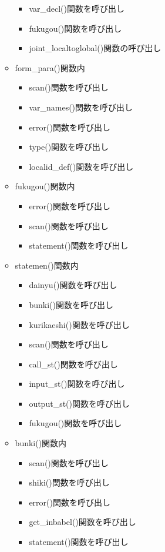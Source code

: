 \documentclass{jarticle}
\begin{document}
\begin{itemize}
\begin{itemize}
\begin{itemize}
      \item var\_decl()関数を呼び出し
      \item fukugou()関数を呼び出し
      \item joint\_localtoglobal()関数の呼び出し
    \end{itemize}
    \item form\_para()関数内
    \begin{itemize}
      \item scan()関数を呼び出し
      \item var\_names()関数を呼び出し
      \item error()関数を呼び出し
      \item type()関数を呼び出し
      \item localid\_def()関数を呼び出し
    \end{itemize}
    \item fukugou()関数内
    \begin{itemize}
      \item error()関数を呼び出し
      \item scan()関数を呼び出し
      \item statement()関数を呼び出し
    \end{itemize}
    \item statemen()関数内
    \begin{itemize}
      \item dainyu()関数を呼び出し
      \item bunki()関数を呼び出し
      \item kurikaeshi()関数を呼び出し
      \item scan()関数を呼び出し
      \item call\_st()関数を呼び出し
      \item input\_st()関数を呼び出し
      \item output\_st()関数を呼び出し
      \item fukugou()関数を呼び出し
    \end{itemize}
    \item bunki()関数内
    \begin{itemize}
      \item scan()関数を呼び出し
      \item shiki()関数を呼び出し
      \item error()関数を呼び出し
      \item get\_inbabel()関数を呼び出し
      \item statement()関数を呼び出し
    \end{itemize}

\end{itemize}
\end{itemize}
\end{document}
